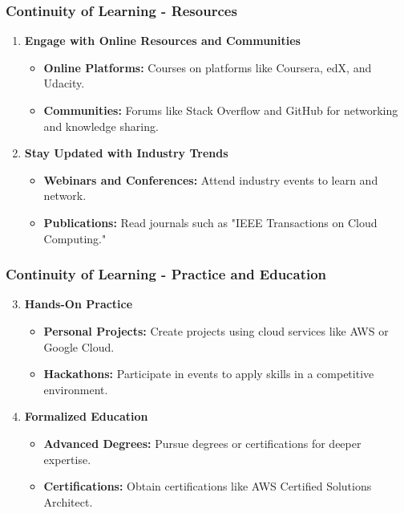 \documentclass[aspectratio=169]{beamer}
\begin{document}
\begin{frame}[fragile]
    \frametitle{Continuity of Learning - Resources}
    \begin{enumerate}
        \item \textbf{Engage with Online Resources and Communities}
            \begin{itemize}
                \item \textbf{Online Platforms:} Courses on platforms like Coursera, edX, and Udacity.
                \item \textbf{Communities:} Forums like Stack Overflow and GitHub for networking and knowledge sharing.
            \end{itemize}
        \item \textbf{Stay Updated with Industry Trends}
            \begin{itemize}
                \item \textbf{Webinars and Conferences:} Attend industry events to learn and network.
                \item \textbf{Publications:} Read journals such as "IEEE Transactions on Cloud Computing."
            \end{itemize}
    \end{enumerate}
\end{frame}

\begin{frame}[fragile]
    \frametitle{Continuity of Learning - Practice and Education}
    \begin{enumerate}
        \setcounter{enumi}{2}
        \item \textbf{Hands-On Practice}
            \begin{itemize}
                \item \textbf{Personal Projects:} Create projects using cloud services like AWS or Google Cloud.
                \item \textbf{Hackathons:} Participate in events to apply skills in a competitive environment.
            \end{itemize}
        \item \textbf{Formalized Education}
            \begin{itemize}
                \item \textbf{Advanced Degrees:} Pursue degrees or certifications for deeper expertise.
                \item \textbf{Certifications:} Obtain certifications like AWS Certified Solutions Architect.
            \end{itemize}
    \end{enumerate}
\end{frame}
\end{document}
